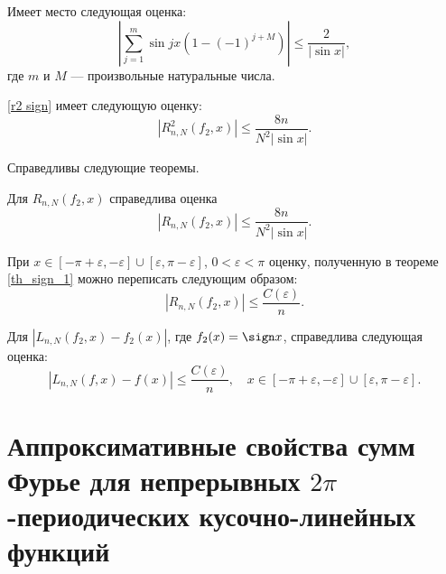 \begin{lemma} \label{lm_sum_sin}
    Имеет место следующая оценка:
    \begin{equation}
      \left| \sum\limits_{j=1}^{m} \sin j x (1 - (-1)^{j+M}) \right| \leq \frac{2}{|\sin x|},
    \end{equation}
    где $m$ и $M$ --- произвольные натуральные числа.
\end{lemma}

\begin{lemma} \label{lm2.1}
  \eqref{r2 sign} имеет следующую оценку:
  \begin{equation}
    |R^2_{n,N}(f_2,x)| \leq \frac{8n}{N^2|\sin x|}.
  \end{equation}
\end{lemma}

Справедливы следующие теоремы.
\begin{theorem} \label{th_sign_1}
  Для $R_{n,N}(f_2,x)$ справедлива оценка
  \begin{equation}
    |R_{n,N}(f_2,x)| \leq \frac{8n}{N^2|\sin x|}.
  \end{equation}
\end{theorem}


\begin{corollary} \label{cor_sign_1}
  При $x \in [-\pi + \varepsilon,- \varepsilon] \cup [\varepsilon, \pi - \varepsilon]$, $0 < \varepsilon < \pi$ оценку, полученную в теореме \ref{th_sign_1} можно переписать следующим образом:
  \begin{equation}
    |R_{n,N}(f_2,x)| \leq \frac{C(\varepsilon)}{n}. \label{coroll sign 1 formula}
  \end{equation}
\end{corollary}


\begin{theorem} \label{th_sign_2}
  Для $|L_{n,N}(f_2,x) - f_2(x)|$, где $f_2(x) = \sign x$, справедлива следующая оценка:
  \begin{equation}
    |L_{n,N}(f,x) - f(x)| \leq \frac{C(\varepsilon)}{n}, \quad x \in [-\pi + \varepsilon,- \varepsilon] \cup [\varepsilon, \pi - \varepsilon].
  \end{equation}
\end{theorem}


\chapter{Аппроксимативные свойства сумм Фурье для непрерывных $2\pi$-периодических
 кусочно-линейных функций}


